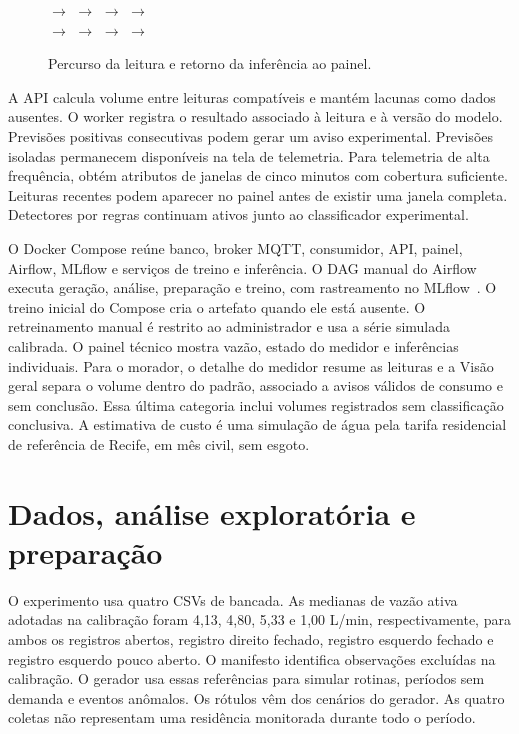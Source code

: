 \documentclass[12pt]{article}
\begin{document}
\begin{figure}[ht]
\centering
{}
$\rightarrow$ 
$\rightarrow$ 
$\rightarrow$ 
$\rightarrow$ \\[6pt]
$\rightarrow$ 
$\rightarrow$ 
$\rightarrow$ 
$\rightarrow$ 
\caption{Percurso da leitura e retorno da inferência ao painel.}
\label{fig:fluxo}
\end{figure}

A API calcula volume entre leituras compatíveis e mantém lacunas como dados ausentes. O worker registra o resultado associado à leitura e à versão do modelo. Previsões positivas consecutivas podem gerar um aviso experimental. Previsões isoladas permanecem disponíveis na tela de telemetria. Para telemetria de alta frequência, obtém atributos de janelas de cinco minutos com cobertura suficiente. Leituras recentes podem aparecer no painel antes de existir uma janela completa. Detectores por regras continuam ativos junto ao classificador experimental.

O Docker Compose reúne banco, broker MQTT, consumidor, API, painel, Airflow, MLflow e serviços de treino e inferência. O DAG manual do Airflow~\cite{airflow} executa geração, análise, preparação e treino, com rastreamento no MLflow~\cite{mlflow}. O treino inicial do Compose cria o artefato quando ele está ausente. O retreinamento manual é restrito ao administrador e usa a série simulada calibrada. O painel técnico mostra vazão, estado do medidor e inferências individuais. Para o morador, o detalhe do medidor resume as leituras e a Visão geral separa o volume dentro do padrão, associado a avisos válidos de consumo e sem conclusão. Essa última categoria inclui volumes registrados sem classificação conclusiva. A estimativa de custo é uma simulação de água pela tarifa residencial de referência de Recife, em mês civil, sem esgoto.

\section{Dados, análise exploratória e preparação}
O experimento usa quatro CSVs de bancada. As medianas de vazão ativa adotadas na calibração foram 4,13, 4,80, 5,33 e 1,00 L/min, respectivamente, para ambos os registros abertos, registro direito fechado, registro esquerdo fechado e registro esquerdo pouco aberto. O manifesto identifica observações excluídas na calibração. O gerador usa essas referências para simular rotinas, períodos sem demanda e eventos anômalos. Os rótulos vêm dos cenários do gerador. As quatro coletas não representam uma residência monitorada durante todo o período.
\end{document}
